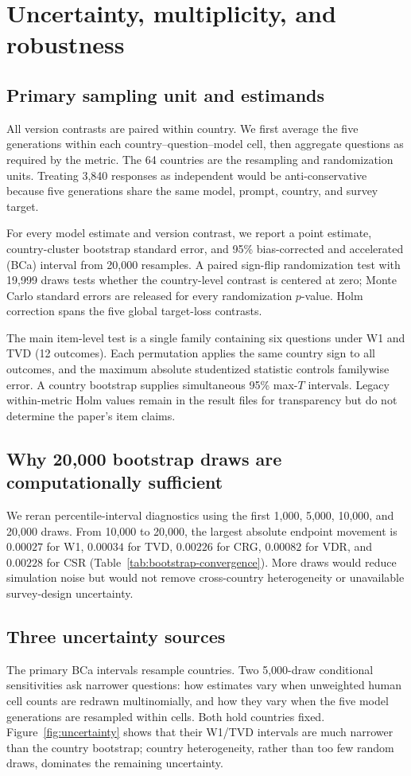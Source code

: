 \section{Uncertainty, multiplicity, and robustness}
\label{app:inference}

\subsection{Primary sampling unit and estimands}
All version contrasts are paired within country. We first average the five generations
within each country--question--model cell, then aggregate questions as required by the
metric. The 64 countries are the resampling and randomization units. Treating 3,840
responses as independent would be anti-conservative because five generations share the
same model, prompt, country, and survey target.

For every model estimate and version contrast, we report a point estimate,
country-cluster bootstrap standard error, and 95\% bias-corrected and accelerated (BCa)
interval from 20,000 resamples. A paired sign-flip randomization test with 19,999 draws
tests whether the country-level contrast is centered at zero; Monte Carlo standard errors
are released for every randomization $p$-value. Holm correction spans the five global
target-loss contrasts.

The main item-level test is a single family containing six questions under W1 and TVD
(12 outcomes). Each permutation applies the same country sign to all outcomes, and the
maximum absolute studentized statistic controls familywise error. A country bootstrap
supplies simultaneous 95\% max-$T$ intervals. Legacy within-metric Holm values remain in
the result files for transparency but do not determine the paper's item claims.

\subsection{Why 20,000 bootstrap draws are computationally sufficient}
We reran percentile-interval diagnostics using the first 1,000, 5,000, 10,000, and
20,000 draws. From 10,000 to 20,000, the largest absolute endpoint movement is
$0.00027$ for W1, $0.00034$ for TVD, $0.00226$ for CRG, $0.00082$ for VDR, and
$0.00228$ for CSR (Table~\ref{tab:bootstrap-convergence}). More draws would reduce
simulation noise but would not remove cross-country heterogeneity or unavailable
survey-design uncertainty.

\subsection{Three uncertainty sources}
The primary BCa intervals resample countries. Two 5,000-draw conditional sensitivities
ask narrower questions: how estimates vary when unweighted human cell counts are redrawn
multinomially, and how they vary when the five model generations are resampled within
cells. Both hold countries fixed. Figure~\ref{fig:uncertainty} shows that their W1/TVD
intervals are much narrower than the country bootstrap; country heterogeneity, rather
than too few random draws, dominates the remaining uncertainty.

